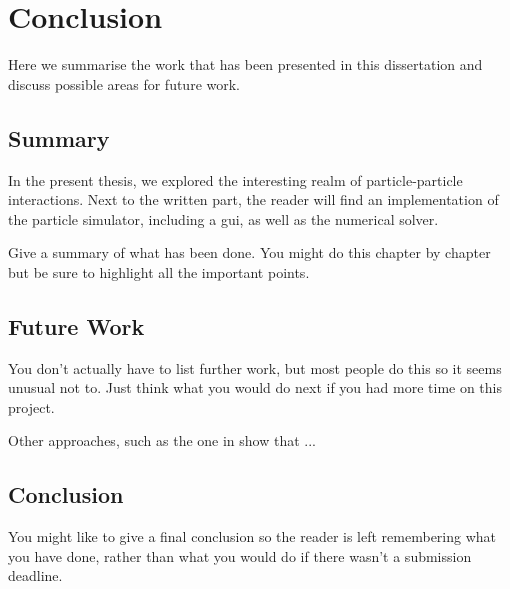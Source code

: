 \chapter{Conclusion}
\label{chap:conclusion}

Here we summarise the work that has been presented in this dissertation and discuss
possible areas for future work.

\section{Summary}
In the present thesis, we explored the interesting realm of particle-particle interactions.
Next to the written part, the reader will find an implementation of the particle simulator, including a \gls{gui}, as well as the numerical solver.

Give a summary of what has been done. You might do this chapter by chapter but be sure to highlight all the important points.

\section{Future Work}
You don't actually have to list further work, but most people do this so it seems unusual not to. Just think what you would do next if you had more time on this project.

Other approaches, such as the one in \cite{2015-spectral-method-for-boltzmann-equation} show that ...

\section{Conclusion}
You might like to give a final conclusion so the reader is left remembering what you have done, rather than what you would do if there wasn't a submission deadline.
